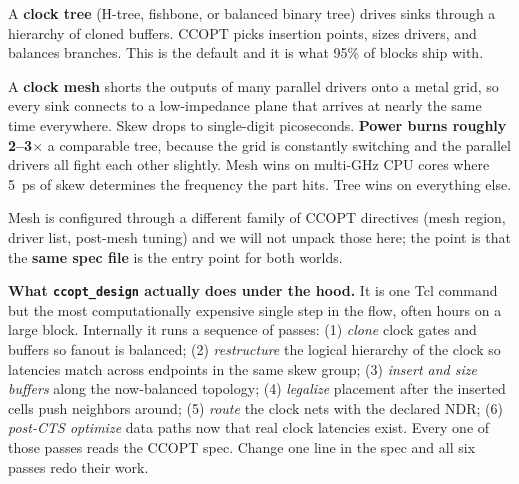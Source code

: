 A \textbf{clock tree} (H-tree, fishbone, or balanced binary tree) drives sinks through a hierarchy of cloned buffers. CCOPT picks insertion points, sizes drivers, and balances branches. This is the default and it is what 95\% of blocks ship with.

A \textbf{clock mesh} shorts the outputs of many parallel drivers onto a metal grid, so every sink connects to a low-impedance plane that arrives at nearly the same time everywhere. Skew drops to single-digit picoseconds. \textbf{Power burns roughly 2--3$\times$} a comparable tree, because the grid is constantly switching and the parallel drivers all fight each other slightly. Mesh wins on multi-GHz CPU cores where 5~ps of skew determines the frequency the part hits. Tree wins on everything else.

Mesh is configured through a different family of CCOPT directives (mesh region, driver list, post-mesh tuning) and we will not unpack those here; the point is that the \textbf{same spec file} is the entry point for both worlds.

\begin{sidebar}
\textbf{What \texttt{ccopt\_design} actually does under the hood.} It is one Tcl command but the most computationally expensive single step in the flow, often hours on a large block. Internally it runs a sequence of passes: (1) \emph{clone} clock gates and buffers so fanout is balanced; (2) \emph{restructure} the logical hierarchy of the clock so latencies match across endpoints in the same skew group; (3) \emph{insert and size buffers} along the now-balanced topology; (4) \emph{legalize} placement after the inserted cells push neighbors around; (5) \emph{route} the clock nets with the declared NDR; (6) \emph{post-CTS optimize} data paths now that real clock latencies exist. Every one of those passes reads the CCOPT spec. Change one line in the spec and all six passes redo their work.
\end{sidebar}

